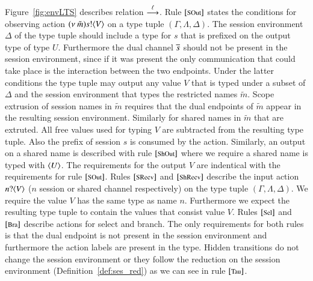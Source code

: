 Figure~\ref{fig:envLTS} describes relation $\stackrel{\ell}{\longrightarrow}$.
Rule ${\footnotesize [\textrm{SOut}]}$ states the conditions for observing action
$(\nu\ \tilde{m}) s ! \langle V \rangle$ on a type tuple $(\Gamma, \Lambda, \Delta)$. 
The session environment $\Delta$ of the type tuple should include
a type for $s$ that is prefixed on the output type of type $U$.
Furthermore the dual channel $\overline{s}$ should not be
present in the session environment, since if it was present
the only communication that could take place is the interaction
between the two endpoints.
Under the latter conditions the type tuple may output any
value $V$ that is typed under a subset of $\Delta$ and
the session environment that types the restricted names
$\tilde{m}$. Scope extrusion of session names in $\tilde{m}$ requires
that the dual endpoints of $\tilde{m}$ appear in
the resulting session environment. Similarly for shared names
in $\tilde{m}$ that are extruted.
All free values used for typing $V$ are subtracted from the
resulting type tuple. Also the prefix of session $s$ is consumed
by the action.
Similarly, an output on a shared name is described
with rule ${\footnotesize [\textrm{ShOut}]}$ where we require a shared name
is typed with $\langle U \rangle$. The requirements for
the output $V$ are indentical with the requirements for
rule ${\footnotesize [\textrm{SOut}]}$.
Rules ${\footnotesize [\textrm{SRecv}]}$ and ${\footnotesize [\textrm{ShRecv}]}$ describe
the input action $n ? \langle V \rangle$ ($n$ session or shared channel respectively)
on the type tuple $(\Gamma, \Lambda, \Delta)$.
We require the value $V$ has the same type as name $n$. Furthermore
we expect the resulting type tuple to contain the values that
consist value $V$.
Rules ${\footnotesize [\textrm{Sel}]}$ and ${\footnotesize [\textrm{Bra}]}$ describe actions for
select and branch. The only requirements for both
rules is that the dual endpoint is not present in the session
environment and furthermore the action labels are present
in the type.
Hidden transitions do not change the session environment
or they follow the reduction on the session
environment (Definition~\ref{def:ses_red}) as we can see in rule
${\footnotesize [\textrm{Tau}]}$.

\begin{comment}
A second environment LTS, denoted $\hby{\ell}$,
is defined in the lower part of Figure~\ref{fig:envLTS}.
The definition substitutes rules
$\eltsrule{SRecv}$ and $\eltsrule{ShRecv}$
of relation $\by{\ell}$ with rule $\eltsrule{RRcv}$.
All other cases remain the same as the cases for
relation $\by{\ell}$.
Rule $\eltsrule{RRcv}$ restricts the higher-order input
in relation $\hby{\ell}$;
only characteristic processes and trigger processes
are allowed to be received on a higher-order input.
Names can still be received as in the definition of
the $\by{\ell}$ relation.
The conditions for input follow the conditions
for the $\by{\ell}$ definition.
\end{comment}

